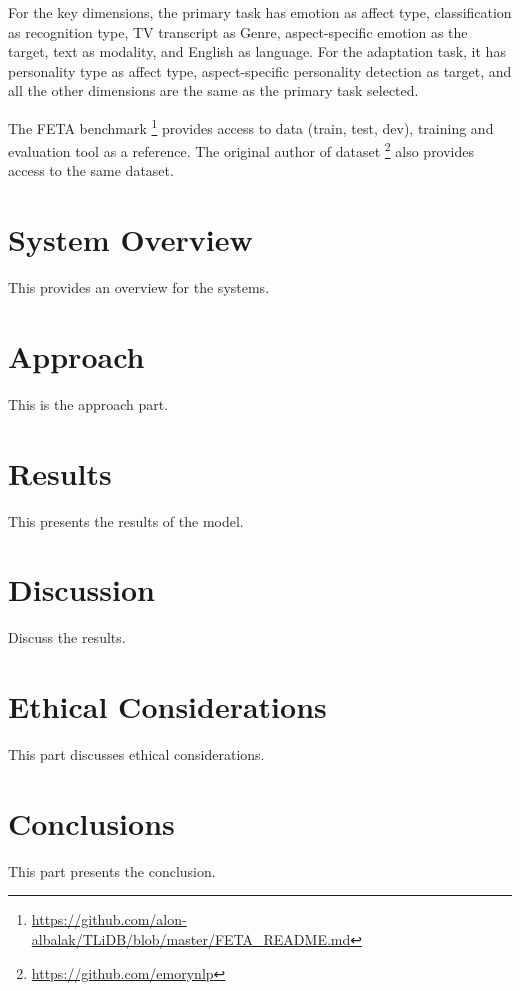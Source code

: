 \documentclass[11pt]{article}
\begin{document}
For the key dimensions, the primary task has emotion as affect type, classification as recognition type, TV transcript as Genre, aspect-specific emotion as the target, text as modality, and English as language. For the adaptation task, it has personality type as affect type,  aspect-specific personality detection as target, and all the other dimensions are the same as the primary task selected.

The FETA benchmark \footnote{\url{https://github.com/alon-albalak/TLiDB/blob/master/FETA_README.md}} provides access to data (train, test, dev), training and evaluation tool as a reference. The original author of dataset \footnote{\url{https://github.com/emorynlp}} also provides access to the same dataset.

\section{System Overview}\label{sys-overview}
This provides an overview for the systems.

\section{Approach}\label{approach}
This is the approach part.


\section{Results}\label{results}
This presents the results of the model.

\section{Discussion}\label{discussion}
Discuss the results.

\section{Ethical Considerations}\label{ethical considerations}
This part discusses ethical considerations.

\section{Conclusions}\label{conclusion}
This part presents the conclusion.
\end{document}
